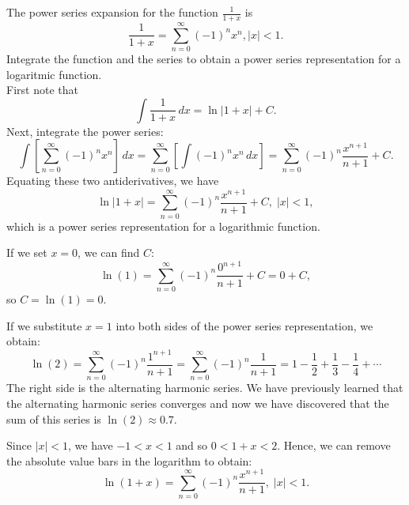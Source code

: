 \documentclass{ximera}
\begin{document}
\begin{example}[example 2]
The power series expansion for the function $\frac{1}{1+x}$ is 
\[
\frac{1}{1+x} = \sum_{n=0}^\infty (-1)^n x^n, |x| < 1.
\]
Integrate the function and the series to obtain a power series representation for a logaritmic function.\\
First note that
\[
\int \frac{1}{1+x} \, dx = \ln|1+x| + C.
\]
Next, integrate the power series:
\[
\int \left[\sum_{n=0}^\infty (-1)^n x^n \right] \, dx =  \sum_{n=0}^\infty \left[ \int(-1)^n x^n \, dx \right] = \sum_{n=0}^\infty  (-1)^n \frac{x^{n+1}}{n+1} +C.
\]
Equating these two antiderivatives, we have
\[
\ln|1+x| = \sum_{n=0}^\infty  (-1)^n \frac{x^{n+1}}{n+1} +C, \; |x| < 1,
\]
which is a power series representation for a logarithmic function.

\begin{remark}[Remark 1]
If we set $x = 0$, we can find $C$:
\[
\ln(1) = \sum_{n=0}^\infty  (-1)^n \frac{0^{n+1}}{n+1} +C = 0 + C,
\]
so $C = \ln(1) = 0$.
\end{remark}

\begin{remark}[Remark 2]
If we substitute $x = 1$ into both sides of the power series representation, we obtain:
\[
\ln(2) = \sum_{n=0}^\infty  (-1)^n \frac{1^{n+1}}{n+1} = \sum_{n=0}^\infty  (-1)^n \frac{1}{n+1} = 1 - \frac12 + \frac13 - \frac14 + \cdots
\]
The right side is the alternating harmonic series. We have previously learned that the alternating harmonic series converges 
and now we have discovered that the sum of this series is $\ln(2) \approx 0.7$.
\end{remark}

\begin{remark}[Remark 3]
Since $|x|<1$, we have $-1 < x< 1$ and so $0 < 1+x < 2$. Hence, we can remove the absolute value bars in the logarithm to obtain:
\[
\ln(1+x) = \sum_{n=0}^\infty  (-1)^n \frac{x^{n+1}}{n+1}, \; |x| < 1.
\]
\end{remark}

\end{example}
\end{document}
